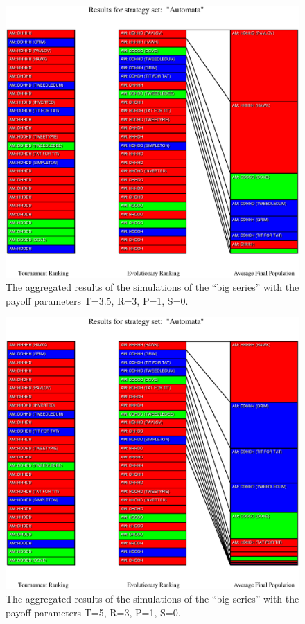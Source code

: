 \begin{figure}
\begin{center}
\includegraphics[width=20cm]{tables/Automata_P3.5.eps}
\caption{\label{Automata_P35} The aggregated results of the
simulations of the ``big series'' with the payoff parameters T=3.5, R=3, P=1,
S=0.}
\end{center}
\end{figure}

\begin{figure}
\begin{center}
\includegraphics[width=20cm]{tables/Automata_P5.eps}
\caption{\label{Automata_P5} The aggregated results of the
simulations of the ``big series'' with the payoff parameters T=5, R=3, P=1,
S=0.}
\end{center}
\end{figure}

